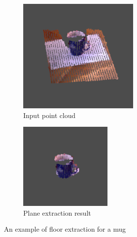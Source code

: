 \begin{figure}
\centering
\begin{subfigure}{.3\textwidth}
  \centering
  \includegraphics[width=.8\linewidth]{fig/floorcut1}
  \caption{Input point cloud}
  \label{fig:sub1}
\end{subfigure}%
\begin{subfigure}{.3\textwidth}
  \centering
  \includegraphics[width=.8\linewidth]{fig/floorcut2}
  \caption{Plane extraction result}
  \label{fig:sub2}
\end{subfigure}
\caption{An example of floor extraction for a mug}
\label{fig:floorcut}
\end{figure}

